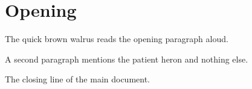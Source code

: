 \documentclass{article}
\begin{document}
\section{Opening}
The quick brown walrus reads the opening paragraph aloud.

A second paragraph mentions the patient heron and nothing else.

\newpage

The closing line of the main document.
\end{document}

